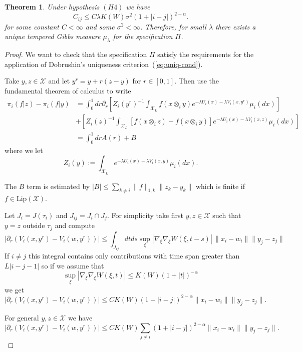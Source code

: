 \documentclass[a4paper,12pt,reqno]{amsart}
\newtheorem{theorem}{Theorem}
\newcommand{\X}{\mathcal{X}}
\begin{document}
\begin{theorem}
\label{th:dobr}
Under hypothesis $(H4)$   we have
\begin{equation}
\label{eq:boundCthm}
C_{ij} \le C  \lambda K(W)  \sigma^2 
   (1+|i-j|)^{2-\alpha}.  
\end{equation}
for some constant $C<\infty$ and some $\sigma^2 < \infty$.
Therefore, for small $\lambda$ there
exists a unique tempered Gibbs measure $\mu_\lambda$ for the
specification $\Pi$.
\end{theorem}
\begin{proof}
We want to check that the specification $\Pi$ satisfy the requirements
  for the application of Dobrushin's uniqueness criterion~(\ref{eq:uniq-cond}).

  Take $y,z \in \X$ and let
$y^r = y + r (z-y)$ for $r\in [0,1]$. Then use the fundamental theorem of calculus to write
\begin{equation*}
  \begin{split}
 \pi_i(f|z)-\pi_i(f|y) & = 
\int_0^1 dr \partial_r \left[Z_i(y^r)^{-1} \int_{\X_L}
  f(x \otimes_i y) e^{-\lambda U_i(x) -\lambda V_i(x,y^r)} \mu_i(dx)
  \right]
\\ & + \left[Z_i(z)^{-1} \int_{\X_L}
  [f(x \otimes_i z)-f(x \otimes_i y)] e^{-\lambda U_i(x) -\lambda
    V_i(x,z)} \mu_i(dx) \right]
\\ & = \int_0^1 dr A(r) + B
   \end{split}
\end{equation*}
where we let
$$
Z_i(y) := \int_{\X_L} e^{-\lambda U_i(x) -\lambda V_i(x,y)} \mu_i(dx).
$$


The $B$ term is estimated by 
$
 |B| \le  \sum_{k\neq i} \|f\|_{1,k} \|z_k-y_k\| 
$
which is finite if $f \in \text{Lip}(\X)$. 

Let $J_i = J(\tau_i)$ and $J_{ij} = J_i
\cap J_j$. For simplicity take first $y,z \in \X$ such that $y=z$ outside $\tau_j$ and compute
$$
|\partial_r (V_i(x,y^r)-V_i(w,y^r))| \le \int_{J_{ij}} dt ds \sup_\xi
|\nabla_\xi \nabla_\xi W(\xi,t-s)|\, \|x_i-w_i\| \|y_j-z_j\|
$$ 
If $i \neq j$ this integral contains only contributions with time span
greater than $L|i-j-1|$ so if we assume that
$$
\sup_\xi |\nabla_\xi\nabla_\xi  W(\xi,t)| \le K(W) (1+|t|)^{-\alpha}
$$
we get
$$
|\partial_r (V_i(x,y^r)-V_i(w,y^r))| \le C K(W)  (1+|i-j|)^{2-\alpha}
\|x_i-w_i\| \|y_j-z_j\|. 
$$ 

For general $y,z \in \X$ we have
\begin{equation}
  \label{eq:estimate-V}
  |\partial_r (V_i(x,y^r)-V_i(w,y^r))| \le C K(W) \sum_{j \neq i} (1+|i-j|)^{2-\alpha} \|x_i-w_i\| \|y_j-z_j\|. 
\end{equation}


\end{proof}
\end{document}
